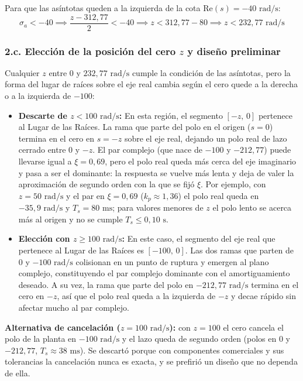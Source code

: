 \documentclass[11pt,a4paper]{article}
\begin{document}
Para que las asíntotas queden a la izquierda de la cota $\text{Re}(s) = -40\text{ rad/s}$:
\begin{equation}
    \sigma_a < -40 \implies \frac{z - 312{,}77}{2} < -40 \implies z < 312{,}77 - 80 \implies z < 232{,}77\text{ rad/s}
\end{equation}

\subsubsection*{2.c. Elección de la posición del cero $z$ y diseño preliminar}
Cualquier $z$ entre $0$ y $232{,}77\text{ rad/s}$ cumple la condición de las asíntotas, pero la forma del lugar de raíces sobre el eje real cambia según el cero quede a la derecha o a la izquierda de $-100$:
\begin{itemize}
    \item \textbf{Descarte de $z < 100\text{ rad/s}$:} En esta región, el segmento $[-z,\, 0]$ pertenece al Lugar de las Raíces. La rama que parte del polo en el origen ($s = 0$) termina en el cero en $s = -z$ sobre el eje real, dejando un polo real de lazo cerrado entre $0$ y $-z$. El par complejo (que nace de $-100$ y $-212{,}77$) puede llevarse igual a $\xi = 0{,}69$, pero el polo real queda más cerca del eje imaginario y pasa a ser el dominante: la respuesta se vuelve más lenta y deja de valer la aproximación de segundo orden con la que se fijó $\xi$. Por ejemplo, con $z = 50\text{ rad/s}$ y el par en $\xi = 0{,}69$ ($k_p \approx 1{,}36$) el polo real queda en $-35{,}9\text{ rad/s}$ y $T_s = 80\text{ ms}$; para valores menores de $z$ el polo lento se acerca más al origen y no se cumple $T_s \le 0{,}10\text{ s}$.
    \item \textbf{Elección con $z \ge 100\text{ rad/s}$:} En este caso, el segmento del eje real que pertenece al Lugar de las Raíces es $[-100,\, 0]$. Las dos ramas que parten de $0$ y $-100\text{ rad/s}$ colisionan en un punto de ruptura y emergen al plano complejo, constituyendo el par complejo dominante con el amortiguamiento deseado. A su vez, la rama que parte del polo en $-212{,}77\text{ rad/s}$ termina en el cero en $-z$, así que el polo real queda a la izquierda de $-z$ y decae rápido sin afectar mucho al par complejo.
\end{itemize}

\textbf{Alternativa de cancelación ($z = 100\text{ rad/s}$):} con $z = 100$ el cero cancela el polo de la planta en $-100\text{ rad/s}$ y el lazo queda de segundo orden (polos en $0$ y $-212{,}77$, $T_s \approx 38\text{ ms}$). Se descartó porque con componentes comerciales y sus tolerancias la cancelación nunca es exacta, y se prefirió un diseño que no dependa de ella.
\end{document}
